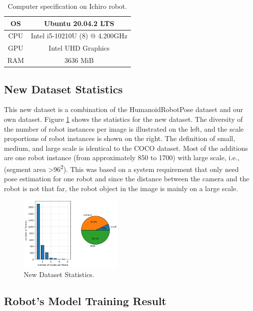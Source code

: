 \begin{table}
\caption{Computer specification on Ichiro robot.}
\centering
    \begin{tabular}{|c|c|}
    \hline
    OS      & Ubuntu 20.04.2 LTS \\
    \hline
    CPU     & Intel i5-10210U (8) @ 4.200GHz \\
    \hline
    GPU     & Intel UHD Graphics  \\
    \hline
    RAM     & 3636 MiB \\
    \hline
    \end{tabular}
    \label{tb:computerspecichiro}
\end{table}

\subsection{New Dataset Statistics}
\label{subsec:new-dataset-statistics}

This new dataset is a combination of the HumanoidRobotPose dataset \citep{amini2021} and our own dataset. Figure \ref{fig:new-dataset-statistics} shows the statistics for the new dataset.
The diversity of the number of robot instances per image is illustrated on the left, and the scale proportions of robot instances is shown on the right. The definition of small, medium, and large scale is identical to the COCO dataset.
Most of the additions are one robot instance (from approximately 850 to 1700) with large scale, i.e., (segment area \textgreater 96\textsuperscript{2}). 
This was based on a system requirement that only need pose estimation for one robot and since the distance between the camera and the robot is not that far, the robot object in the image is mainly on a large scale.
\begin{figure}[ht]
  \centering
  \includegraphics[width=0.45\textwidth]{gambar/new_dataset.png}
  \caption{New Dataset Statistics.}
  \label{fig:new-dataset-statistics}
\end{figure}


\subsection{Robot's Model Training Result}
\label{subsec:robotmodeltrainingresult}

